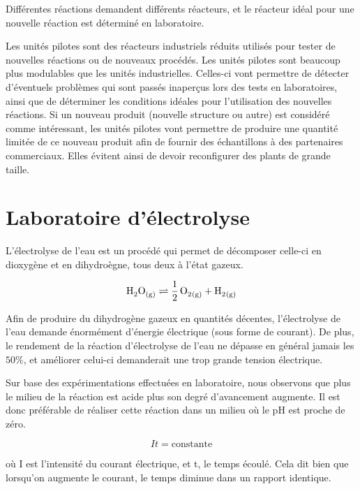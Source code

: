\documentclass[a4paper, oneside, 12pt]{article}
\begin{document}
Différentes réactions demandent différents réacteurs, et le réacteur idéal pour une nouvelle réaction est déterminé en laboratoire.
 
Les unités pilotes sont des réacteurs industriels réduits utilisés pour tester de nouvelles réactions ou de nouveaux procédés. Les unités pilotes sont beaucoup plus modulables que les unités industrielles. Celles-ci vont permettre de détecter d'éventuels problèmes qui sont passés inaperçus lors des tests en laboratoires, ainsi que de déterminer les conditions idéales pour l'utilisation des nouvelles réactions. Si un nouveau produit (nouvelle structure ou autre) est considéré comme intéressant, les unités pilotes vont permettre de produire une quantité limitée de ce nouveau produit afin de fournir des échantillons à des partenaires commerciaux. Elles évitent ainsi de devoir reconfigurer des plants de grande taille.

\section{Laboratoire d’électrolyse}

L'électrolyse de l'eau est un procédé qui permet de décomposer celle-ci en dioxygène 
et en dihydroègne, tous deux à l'état gazeux.

\begin{equation*}
	\ce{H2O_{(g)} \rightleftharpoons \frac{1}{2} \, O2_{(g)} + H2_{(g)}} 
\end{equation*}

Afin de produire du dihydrogène gazeux en quantités décentes, l'électrolyse de l'eau 
demande énormément d'énergie électrique (sous forme de courant). De plus, le rendement
de la réaction d'électrolyse de l'eau ne dépasse en général jamais les $50\%$, 
et améliorer celui-ci demanderait une trop grande tension électrique.

Sur base des expérimentations effectuées en laboratoire, nous observons que plus 
le milieu de la réaction est acide plus son degré d'avancement augmente. Il est donc
préférable de réaliser cette réaction dans un milieu où le pH est proche de zéro.


\begin{equation*}
	It = \text{constante}
\end{equation*}

où I est l'intensité du courant électrique, et t, le temps écoulé.
Cela dit bien que lorsqu'on augmente le courant, le temps diminue dans un rapport identique.
\end{document}
